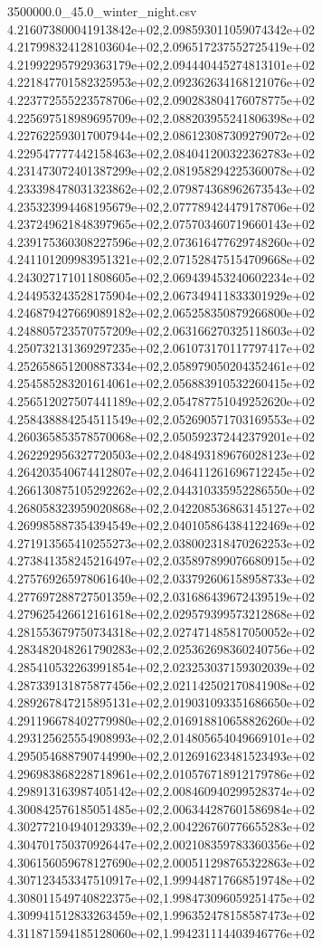 \begin{filecontents*}{3500000.0_45.0_winter_night.csv}
4.216073800041913842e+02,2.098593011059074342e+02
4.217998324128103604e+02,2.096517237552725419e+02
4.219922957929363179e+02,2.094440445274813101e+02
4.221847701582325953e+02,2.092362634168121076e+02
4.223772555223578706e+02,2.090283804176078775e+02
4.225697518989695709e+02,2.088203955241806398e+02
4.227622593017007944e+02,2.086123087309279072e+02
4.229547777442158463e+02,2.084041200322362783e+02
4.231473072401387299e+02,2.081958294225360078e+02
4.233398478031323862e+02,2.079874368962673543e+02
4.235323994468195679e+02,2.077789424479178706e+02
4.237249621848397965e+02,2.075703460719660143e+02
4.239175360308227596e+02,2.073616477629748260e+02
4.241101209983951321e+02,2.071528475154709668e+02
4.243027171011808605e+02,2.069439453240602234e+02
4.244953243528175904e+02,2.067349411833301929e+02
4.246879427669089182e+02,2.065258350879266800e+02
4.248805723570757209e+02,2.063166270325118603e+02
4.250732131369297235e+02,2.061073170117797417e+02
4.252658651200887334e+02,2.058979050204352461e+02
4.254585283201614061e+02,2.056883910532260415e+02
4.256512027507441189e+02,2.054787751049252620e+02
4.258438884254511549e+02,2.052690571703169553e+02
4.260365853578570068e+02,2.050592372442379201e+02
4.262292956327720503e+02,2.048493189676028123e+02
4.264203540674412807e+02,2.046411261696712245e+02
4.266130875105292262e+02,2.044310335952286550e+02
4.268058323959020868e+02,2.042208536863145127e+02
4.269985887354394549e+02,2.040105864384122469e+02
4.271913565410255273e+02,2.038002318470262253e+02
4.273841358245216497e+02,2.035897899076680915e+02
4.275769265978061640e+02,2.033792606158958733e+02
4.277697288727501359e+02,2.031686439672439519e+02
4.279625426612161618e+02,2.029579399573212868e+02
4.281553679750734318e+02,2.027471485817050052e+02
4.283482048261790283e+02,2.025362698360240756e+02
4.285410532263991854e+02,2.023253037159302039e+02
4.287339131875877456e+02,2.021142502170841908e+02
4.289267847215895131e+02,2.019031093351686650e+02
4.291196678402779980e+02,2.016918810658826260e+02
4.293125625554908993e+02,2.014805654049669101e+02
4.295054688790744990e+02,2.012691623481523493e+02
4.296983868228718961e+02,2.010576718912179786e+02
4.298913163987405142e+02,2.008460940299528374e+02
4.300842576185051485e+02,2.006344287601586984e+02
4.302772104940129339e+02,2.004226760776655283e+02
4.304701750370926447e+02,2.002108359783360356e+02
4.306156059678127690e+02,2.000511298765322863e+02
4.307123453347510917e+02,1.999448717668519748e+02
4.308011549740822375e+02,1.998473096059251475e+02
4.309941512833263459e+02,1.996352478158587473e+02
4.311871594185128060e+02,1.994231114403946776e+02

\end{filecontents*}
